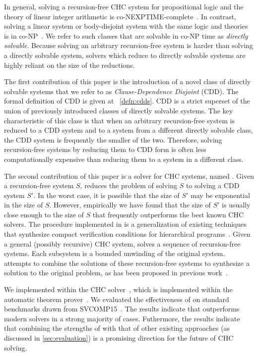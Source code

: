 In general, solving a recursion-free CHC system for
propositional logic and the theory of linear integer arithmetic is
co-NEXPTIME-complete~\cite{rummer13b}.
%
In contrast, solving a linear system or body-disjoint system with the
same logic and theories is in co-NP~\cite{rummer13b}.
%
We refer to such classes that are solvable in co-NP time as
\emph{directly solvable}.
%
Because solving an arbitrary recursion-free system is harder than
solving a directly solvable system, solvers which reduce to directly
solvable systems are highly reliant on the size of the reductions.

The first contribution of this paper is the introduction of a novel
class of directly solvable systems that we refer to as
\emph{Clause-Dependence Disjoint} (CDD).
%
The formal definition of CDD is given at ~\autoref{defn:cdds}.
%
CDD is a strict superset of the union of previously introduced classes
of directly solvable systems.
%
The key characteristic of this class is that when an arbitrary
recursion-free system is reduced to a CDD system and to a system from
a different directly solvable class, the CDD system is frequently the
smaller of the two.
%
Therefore, solving recursion-free systems by reducing them to CDD form
is often less computationally expensive than reducing them to a
system in a different class.

The second contribution of this paper is a solver for CHC systems,
named \sys.
%
Given a recursion-free system $S$, \sys reduces the problem of solving
$S$ to solving a CDD system $S'$.
%
In the worst case, it is possible that the size of $S'$ may be
exponential in the size of $S$.
%
However, empirically we have found that the size of $S'$ is usually
close enough to the size of $S$ that \sys frequently outperforms the best
known CHC solvers.
%
The procedure implemented in \sys is a generalization of existing
techniques that synthesize compact verification conditions for
hierarchical programs~\cite{flanagan01,lal-qadeer15}.
%
Given a general (possibly recursive) CHC system, \sys solves a
sequence of recursion-free systems.
%
Each subsystem is a bounded unwinding of the original system. \sys
attempts to combine the solutions of these recursion-free systems to
synthesize a solution to the original problem, as has been proposed
in previous work~\cite{rummer13b}.

We implemented \sys within the \duality CHC solver~\cite{bjorner13},
which is implemented within the \zthree automatic theorem
prover~\cite{moura08}.
%
We evaluated the effectiveness of \sys on standard benchmarks drawn
from SVCOMP15~\cite{svcomp15}.
%
The results indicate that \sys outperforms modern solvers in a strong
majority of cases.
%
Futhermore, the results indicate that combining the strengths of \sys
with that of other existing approaches (as discussed in
\autoref{sec:evaluation}) is a promising direction for the future of
CHC solving.

